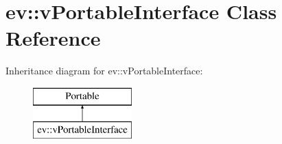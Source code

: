 \hypertarget{classev_1_1vPortableInterface}{}\section{ev\+:\+:v\+Portable\+Interface Class Reference}
\label{classev_1_1vPortableInterface}
Inheritance diagram for ev\+:\+:v\+Portable\+Interface\+:\begin{figure}[H]
\begin{center}
\leavevmode
\includegraphics[height=2.000000cm]{classev_1_1vPortableInterface}
\end{center}
\end{figure}
